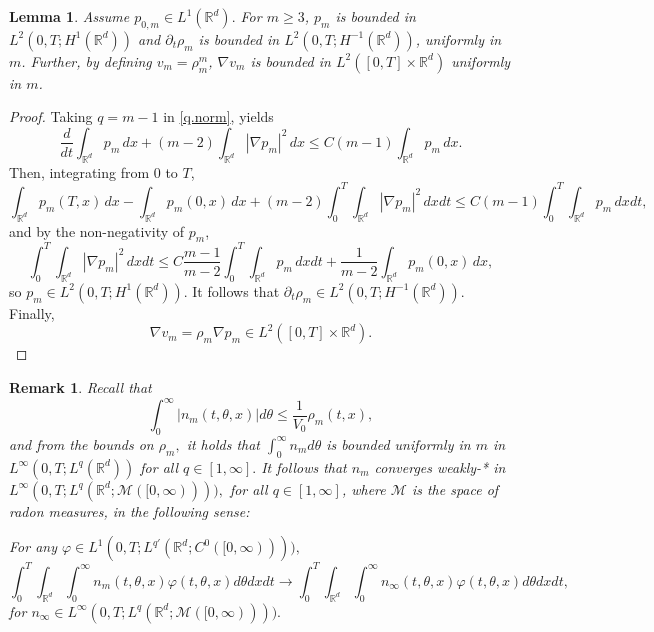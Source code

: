 \documentclass{amsart}
\newtheorem{lemma}[theorem]{Lemma}
\newtheorem{remark}[theorem]{Remark}
\def\R{\mathbb R}
\begin{document}
\begin{lemma}\label{secondbds}
    Assume $p_{0,m} \in L^1(\R^d).$ For $m \geq 3$, $p_m$ is bounded in $L^2(0,T;H^1(\R^d))$ and $\partial_t \rho_m $ is bounded in $ L^2(0,T;H^{-1}(\R^d))$, uniformly in $m$. Further, by defining $v_m=\rho_m^m$, $\nabla v_m$ is bounded in $L^2([0,T]\times \R^d)$ uniformly in $m$.
\end{lemma}
\begin{proof}
    Taking $q=m-1$ in \eqref{q.norm}, yields
    \begin{equation*}
        \frac{d}{dt}\int_{\R^d}p_m\, dx + (m-2)\int_{\R^d}|\nabla p_m|^2\, dx \leq C(m-1)\int_{\R^d}p_m\, dx.
    \end{equation*}
    Then, integrating from $0$ to $T$,
    \begin{equation*}
        \int_{\R^d}p_m(T,x)\,dx -\int_{\R^d}p_m(0,x)\,dx +(m-2)\int_{0}^{T}\int_{\R^d}|\nabla p_m|^2\, dx dt \leq C(m-1)\int_{0}^{T}\int_{\R^d}p_m\, dxdt,
    \end{equation*}
    and by the non-negativity of $p_m$,
    \begin{equation*}
        \int_{0}^{T}\int_{\R^d}|\nabla p_m|^2\, dx dt \leq C\frac{m-1}{m-2}\int_{0}^{T}\int_{\R^d}p_m\, dxdt+\frac{1}{m-2}\int_{\R^d}p_m(0,x)\,dx,
    \end{equation*}
    so $p_m \in L^2(0,T;H^1(\R^d))$. It follows that $\partial_t \rho_m \in L^2(0,T;H^{-1}(\R^d)).$
    Finally, 
    \begin{equation*}
        \nabla v_m=\rho_m\nabla p_m \in L^2([0,T]\times \R^d).
    \end{equation*}
\end{proof}
\begin{remark}
    Recall that
    $$
    \int_{0}^{\infty}|n_m(t,\theta,x)|d\theta \leq \frac{1}{V_0}\rho_m(t,x),
    $$
    and from the bounds on $\rho_m,$ it holds that
    $\int_{0}^{\infty}n_m d\theta$ is bounded uniformly in $m$ in $L^\infty(0,T;L^q(\R^d))$ for all $q \in [1,\infty].$ It follows that $n_m$ converges weakly-* in $L^\infty(0,T;L^q(\R^d;\mathcal{M}([0,\infty)))),$ for all $q \in [1,\infty]$, where $\mathcal{M}$ is the space of radon measures, in the following sense:
    
    For any $\varphi \in L^1(0,T;L^{q'}(\R^d;C^0([0,\infty)))),$ $$
    \int_{0}^{T}\int_{\R^d}\int_{0}^{\infty}n_m(t,\theta,x)\varphi(t,\theta,x)d\theta dx dt \rightarrow \int_{0}^{T}\int_{\R^d}\int_{0}^{\infty}n_\infty(t,\theta,x)\varphi(t,\theta,x)d\theta dx dt,
    $$
    for $n_\infty \in L^\infty(0,T;L^q(\R^d;\mathcal{M}([0,\infty)))).$
\end{remark}
\end{document}
